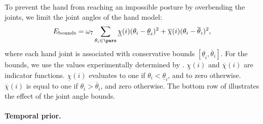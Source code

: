 To prevent the hand from reaching an impossible posture by overbending the joints, we limit the joint angles of the hand model:
\begin{equation}
   E_{\text{bounds}} = \omegabounds \sum_{\theta_i \in \pars}
        \underline{\chi}(i)(\theta_i - \underline{\theta}_i)^2
            +
        \overline{\chi}(i)(\theta_i - \overline{\theta}_i)^2,
        \label{eq:bound}
\end{equation}
%
where each hand joint is associated with conservative bounds $\left[ \underline{\theta}_i,\overline{\theta}_i\right]$. For the bounds, we use the values experimentally determined by \cite{chan_95}.  {$\underline{\chi}(i)$} and {$\overline{\chi}(i)$} are indicator functions. {$\underline{\chi}(i)$} evaluates to one if $\theta_i < \underline{\theta}_i$, and to zero otherwise. $\overline{\chi}(i)$ is equal to one if $\theta_i > \overline{\theta}_i$, and  zero otherwise.
The bottom row of  illustrates the effect of the joint angle bounds.






\paragraph*{Temporal prior.}

